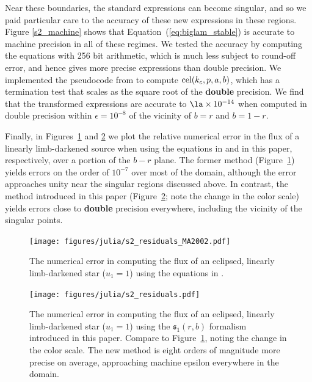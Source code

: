 \documentclass[modern,trackchanges]{aastex63}
\begin{document}
Near these boundaries, the standard \citet{MandelAgol2002} expressions
can become singular, and so we paid particular care to the accuracy of these
new expressions in these regions.  Figure \ref{s2_machine} shows
that Equation~(\ref{eq:biglam_stable}) is accurate to machine
precision in all of these regimes.
We tested the accuracy by computing the equations with 256 bit
arithmetic, which is much less subject to round-off error, and
hence gives more precise expressions than double precision.  We implemented the
pseudocode from \citet{Bulirsch1969} to compute ${\rm cel}(k_c,p,a,b)$,
which has a termination test that scales as the square root of
the {\bf double} precision.  We find that the transformed expressions
are accurate to $\la \times 10^{-14}$ when computed in double precision
within $\epsilon = 10^{-8}$ of the vicinity of $b=r$ and $b=1-r$.

Finally, in Figures~\ref{fig:s2_plot_MA2002} and \ref{fig:s2_plot} we plot
the relative numerical error in the flux of a linearly limb-darkened source
when using the equations in \citet{MandelAgol2002} and in this paper,
respectively, over a portion of the $b-r$ plane. The former method
(Figure~\ref{fig:s2_plot_MA2002}) yields errors
on the order of $10^{-7}$ over most of the domain, although the error approaches
unity near the singular regions discussed above. In contrast, the method introduced
in this paper (Figure~\ref{fig:s2_plot}; note the change in the color scale)
yields errors close to {\bf double} precision everywhere, including the vicinity of the
singular points.

\begin{figure}[p!]
    \begin{centering}
    \texttt{[image: figures/julia/s2\_residuals\_MA2002.pdf]}
    \caption{The numerical error in computing the flux of an eclipsed, linearly
             limb-darkened star ($u_1=1$) using the equations in \citet{MandelAgol2002}.
             \label{fig:s2_plot_MA2002}}
    \end{centering}
\end{figure}

\begin{figure}[p!]
    \begin{centering}
    \texttt{[image: figures/julia/s2\_residuals.pdf]}
    \caption{The numerical error in computing the flux of an eclipsed, linearly
    limb-darkened star ($u_1=1$) using the $\mathfrak{s}_1(r,b)$ formalism introduced in this
    paper. Compare to Figure~\ref{fig:s2_plot_MA2002}, noting the change in the color
    scale. The new method is eight orders of magnitude more precise on average,
    approaching machine epsilon everywhere in the domain.
    \label{fig:s2_plot}}
    \end{centering}
\end{figure}
\end{document}
